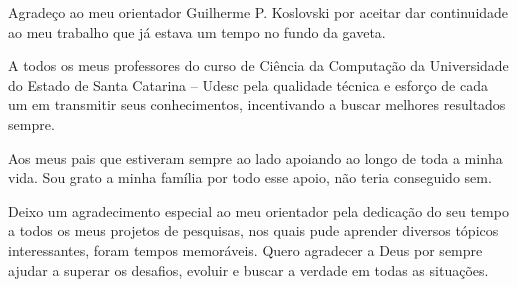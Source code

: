 \begin{agradecimentos}
Agradeço ao meu orientador Guilherme P. Koslovski por aceitar dar continuidade ao meu trabalho que já estava um tempo no fundo da gaveta.

A todos os meus professores do curso de Ciência da Computação da Universidade do Estado de Santa Catarina – Udesc pela qualidade técnica e esforço de cada um em transmitir seus conhecimentos, incentivando a buscar melhores resultados sempre.

Aos meus pais que estiveram sempre ao lado apoiando ao longo de toda a minha vida. Sou grato a minha família por todo esse apoio, não teria conseguido sem.

Deixo um agradecimento especial ao meu orientador pela dedicação do seu tempo a todos os meus projetos de pesquisas, nos quais pude aprender diversos tópicos interessantes, foram tempos memoráveis. Quero agradecer a Deus por sempre ajudar a superar os desafios, evoluir e buscar a verdade em todas as situações.

\end{agradecimentos}
